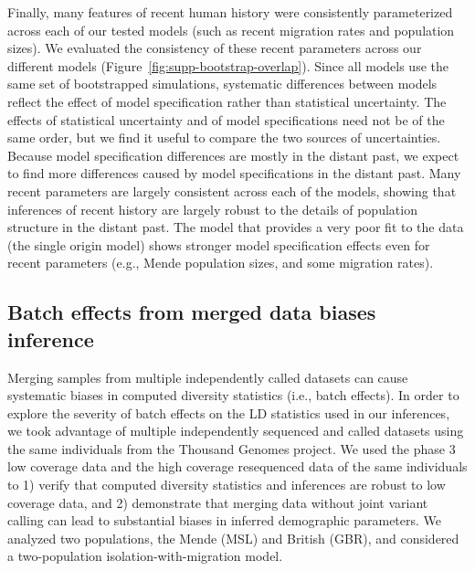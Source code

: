 \documentclass[]{article}
\begin{document}
Finally, many features of recent human history were consistently parameterized
across each of our tested models (such as recent migration rates and population
sizes). We evaluated the consistency of these recent parameters across our
different models (Figure~\ref{fig:supp-bootstrap-overlap}). Since all models use 
the same set of bootstrapped simulations, systematic differences between models 
reflect the effect of model specification rather than statistical uncertainty. The effects 
of statistical uncertainty and of model specifications need not be of the same order, but 
we find it useful to compare the two sources of uncertainties. Because model 
specification differences are mostly in the distant past, we expect to find more 
differences caused by model specifications in the distant past.
Many recent parameters are largely
consistent across each of the models, showing that inferences of recent history
are largely robust to the details of population structure in the distant past.
The model that provides a very poor fit to the data (the single origin model) shows 
stronger model specification effects even for recent parameters (e.g.,
Mende population sizes, and some migration rates). 





\subsection{Batch effects from merged data biases inference}
\label{sec:merged-bias}

Merging samples from multiple independently called datasets can cause
systematic biases in computed diversity statistics (i.e., batch effects). In
order to explore the severity of batch effects on the LD statistics used in our
inferences, we took advantage of multiple independently sequenced and called
datasets using the same individuals from the Thousand Genomes project. We used
the phase 3 low coverage \citet{1000_Genomes_Project_Consortium2015-zq} data
and the high coverage resequenced data of the same individuals
\citep{Byrska-Bishop2021-jl} to 1) verify that computed diversity statistics
and inferences are robust to low coverage data, and 2) demonstrate that merging
data without joint variant calling can lead to substantial biases in inferred
demographic parameters. We analyzed two populations, the Mende (MSL) and
British (GBR), and considered a two-population isolation-with-migration model.
\end{document}
